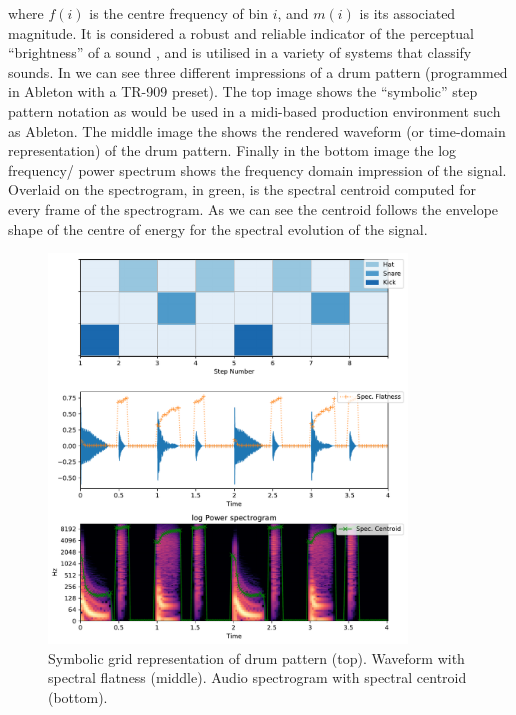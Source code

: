 {{where $f(i)$ is the centre frequency of bin $i$, and $m(i)$ is its associated magnitude. It is considered a robust and reliable indicator of the perceptual ``brightness'' of a sound \citep{Schubert2004}, and is utilised in a variety of systems that classify sounds. In  we can see three different impressions of a drum pattern (programmed in Ableton with a TR-909 preset). The top image shows the ``symbolic'' step pattern notation as would be used in a \acrshort{midi}-based production environment such as Ableton. The middle image the shows the rendered waveform (or time-domain representation) of the drum pattern. Finally in the bottom image the log frequency/ power spectrum shows the frequency domain impression of the signal. Overlaid on the spectrogram, in green, is the spectral centroid computed for every frame of the spectrogram. As we can see the centroid follows the envelope shape of the centre of energy for the spectral evolution of the signal.

\begin{figure}
	\begin{center}
		\includegraphics[width=0.85\textwidth]{ch05_pyconcat/figures/spectral_features.pdf}
	\end{center}
	\caption[Spectral features of a drum pattern]{Symbolic grid representation of drum pattern (top). Waveform with spectral flatness (middle). Audio spectrogram with spectral centroid (bottom).}
	\label{fig:spectral_features}
\end{figure}

}}
